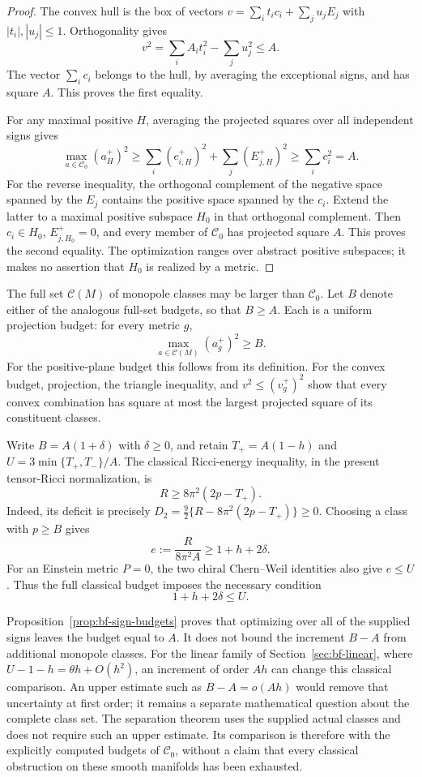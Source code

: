 \begin{proof}
The convex hull is the box of vectors
$v=\sum_i t_ic_i+\sum_j u_jE_j$ with $|t_i|,|u_j|\le1$.
Orthogonality gives
\[
 v^2=\sum_i A_it_i^2-\sum_j u_j^2\le A.
\]
The vector $\sum_i c_i$ belongs to the hull, by averaging the
exceptional signs, and has square $A$.  This proves the first equality.

For any maximal positive $H$, averaging the projected squares over
all independent signs gives
\[
 \max_{a\in\mathcal C_0}(a_H^+)^2
 \ge\sum_i(c_{i,H}^+)^2+\sum_j(E_{j,H}^+)^2
 \ge\sum_i c_i^2=A.
\]
For the reverse inequality, the orthogonal complement of the negative
space spanned by the $E_j$ contains the positive space spanned by the
$c_i$.  Extend the latter to a maximal positive subspace $H_0$ in that
orthogonal complement.  Then $c_i\in H_0$, $E_{j,H_0}^+=0$, and every
member of $\mathcal C_0$ has projected square $A$.  This proves the
second equality.  The optimization ranges over abstract positive
subspaces; it makes no assertion that $H_0$ is realized by a metric.
\end{proof}

The full set $\mathcal C(M)$ of monopole classes may be larger than
$\mathcal C_0$.  Let $B$ denote either of the analogous full-set
budgets, so that $B\ge A$.  Each is a uniform projection budget:
for every metric $g$,
\[
 \max_{a\in\mathcal C(M)}(a_g^+)^2\ge B.
\]
For the positive-plane budget this follows from its definition.  For
the convex budget, projection, the triangle inequality, and
$v^2\le(v_g^+)^2$ show that every convex combination has square at
most the largest projected square of its constituent classes.

Write $B=A(1+\delta)$ with $\delta\ge0$, and retain
$T_+=A(1-h)$ and $U=3\min\{T_+,T_-\}/A$.  The classical
Ricci-energy inequality, in the present tensor-Ricci normalization, is
\begin{equation}\label{eq:bf-complete-budget-ricci}
 R\ge8\pi^2(2p-T_+).
\end{equation}
Indeed, its deficit is precisely
$D_2=\tfrac92\{R-8\pi^2(2p-T_+)\}\ge0$.
Choosing a class with $p\ge B$ gives
\[
 e:=\frac{R}{8\pi^2A}\ge1+h+2\delta.
\]
For an Einstein metric $P=0$, the two chiral Chern--Weil identities
also give $e\le U$.  Thus the full classical budget imposes the
necessary condition
\begin{equation}\label{eq:bf-complete-budget-necessary}
 \boxed{1+h+2\delta\le U.}
\end{equation}

Proposition~\ref{prop:bf-sign-budgets} proves that optimizing over all
of the supplied signs leaves the budget equal to $A$.  It does not
bound the increment $B-A$ from additional monopole classes.  For the
linear family of Section~\ref{sec:bf-linear}, where
$U-1-h=\theta h+O(h^2)$, an increment of order $Ah$ can change this
classical comparison.  An upper estimate such as $B-A=o(Ah)$ would
remove that uncertainty at first order; it remains a separate
mathematical question about the complete class set.  The separation
theorem uses the supplied actual classes and does not require such an
upper estimate.  Its comparison is therefore with the explicitly
computed budgets of $\mathcal C_0$, without a claim that every
classical obstruction on these smooth manifolds has been exhausted.
